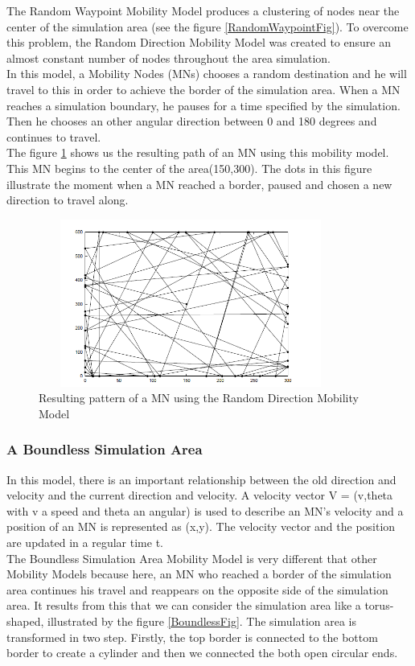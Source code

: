 The Random Waypoint Mobility Model produces a clustering of nodes near the center of the simulation area (see the figure \ref{RandomWaypointFig}). To overcome this problem, the Random Direction Mobility Model was created to ensure an almost constant number of nodes throughout the area simulation.\\ 
In this model, a Mobility Nodes (MNs) chooses a random destination and he will travel to this in order to achieve the border of the simulation area. When a MN reaches a simulation boundary, he pauses for a time specified by the simulation. Then he chooses an other angular direction between 0 and 180 degrees and continues to travel.\\ 
The figure \ref{RandomDirectionFig} shows us the resulting path of an MN using this mobility model. This MN begins to the center of the area(150,300). The dots in this figure illustrate the moment when a MN reached a border, paused and chosen a new direction to travel along.\\

\begin{figure}[h]
\center
\includegraphics[width=10cm,height=55mm]{../images/randomdirection1.png}
\caption{\label{RandomDirectionFig}Resulting pattern of a MN using the Random Direction Mobility Model}
\end{figure}

\newpage
\subsubsection{A Boundless Simulation Area}

In this model, there is an important relationship between the old direction and velocity and the current direction and velocity. A velocity vector V = (v,theta with v a speed and theta an angular) is used to describe an MN's velocity and a position of an MN is represented as (x,y). The velocity vector and the position are updated in a regular time t.\\
The Boundless Simulation Area Mobility Model is very different that other Mobility Models because here, an MN who reached a border of the simulation area continues his travel and reappears on the opposite side of the simulation area. It results from this that we can consider the simulation area like a torus-shaped, illustrated by the figure \ref{BoundlessFig}. The simulation area is transformed in two step. Firstly, the top border is connected to the bottom border to create a cylinder and then we connected the both open circular ends.\\

